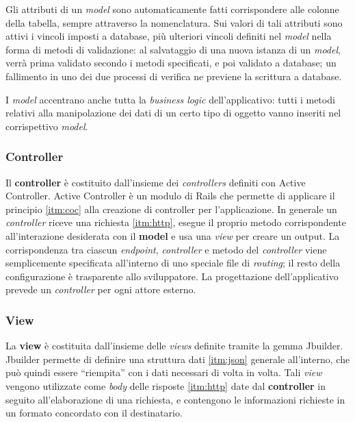 Gli attributi di un \textit{model} sono automaticamente fatti corrispondere alle colonne della tabella, sempre attraverso la nomenclatura. Sui valori di tali attributi sono attivi i vincoli imposti a database, più ulteriori vincoli definiti nel \textit{model} nella forma di metodi di validazione: al salvataggio di una nuova istanza di un \textit{model}, verrà prima validato secondo i metodi specificati, e poi validato a database; un fallimento in uno dei due processi di verifica ne previene la scrittura a database.

I \textit{model} accentrano anche tutta la \textit{business logic} dell'applicativo: tutti i metodi relativi alla manipolazione dei dati di un certo tipo di oggetto vanno inseriti nel corrispettivo \textit{model}.

\subsubsection{Controller}
Il \textbf{controller} è costituito dall'insieme dei \textit{controllers} definiti con Active Controller. Active Controller è un modulo di Rails che permette di applicare il principio \ref{itm:coc} alla creazione di controller per l'applicazione. In generale un \textit{controller} riceve una richiesta \ref{itm:http}, esegue il proprio metodo corrispondente all'interazione desiderata con il \textbf{model} e usa una \textit{view} per creare un output. La corrispondenza tra ciascun \textit{endpoint}, \textit{controller} e metodo del \textit{controller} viene semplicemente specificata all'interno di uno speciale file di \textit{routing}; il resto della configurazione è trasparente allo sviluppatore. La progettazione dell'applicativo prevede un \textit{controller} per ogni attore esterno.

\subsubsection{View}
La \textbf{view} è costituita dall'insieme delle \textit{views} definite tramite la gemma Jbuilder. Jbuilder permette di definire una struttura dati \ref{itm:json} generale all'interno, che può quindi essere ``riempita'' con i dati necessari di volta in volta. Tali \textit{view} vengono utilizzate come \textit{body} delle risposte \ref{itm:http} date dal \textbf{controller} in seguito all'elaborazione di una richiesta, e contengono le informazioni richieste in un formato concordato con il destinatario.

